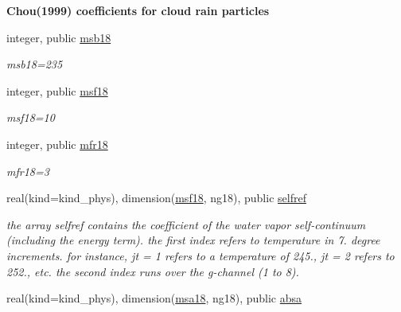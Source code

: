 \begin{Indent}\textbf{ Chou(1999) coefficients for cloud rain particles}\par
\begin{DoxyCompactItemize}
\item 
integer, public \hyperlink{group__module__radsw__kgbnn_gad2e52d9beb90328236a351926d1a3432}{msb18}
\begin{DoxyCompactList}\small\item\em msb18=235 \end{DoxyCompactList}\item 
integer, public \hyperlink{group__module__radsw__kgbnn_ga1d74002f71710887e45df89d3897a10a}{msf18}
\begin{DoxyCompactList}\small\item\em msf18=10 \end{DoxyCompactList}\item 
integer, public \hyperlink{group__module__radsw__kgbnn_ga9fa8140413e7ec769baea4f207e58393}{mfr18}
\begin{DoxyCompactList}\small\item\em mfr18=3 \end{DoxyCompactList}\item 
real(kind=kind\+\_\+phys), dimension(\hyperlink{group__module__radsw__kgbnn_ga1d74002f71710887e45df89d3897a10a}{msf18}, ng18), public \hyperlink{group__module__radsw__kgbnn_ga488f807878d909b8f69457b0d7d8ac6a}{selfref}
\begin{DoxyCompactList}\small\item\em the array selfref contains the coefficient of the water vapor self-\/continuum (including the energy term). the first index refers to temperature in 7. degree increments. for instance, jt = 1 refers to a temperature of 245., jt = 2 refers to 252., etc. the second index runs over the g-\/channel (1 to 8). \end{DoxyCompactList}\item 
real(kind=kind\+\_\+phys), dimension(\hyperlink{namespacemodule__radsw__kgb18_a48213008c9ed8f94aaad4ef327d38583}{msa18}, ng18), public \hyperlink{group__module__radsw__kgbnn_ga8a7787776bd057b1815e92a5f58b9cac}{absa}

\end{DoxyCompactItemize}
\end{Indent}
